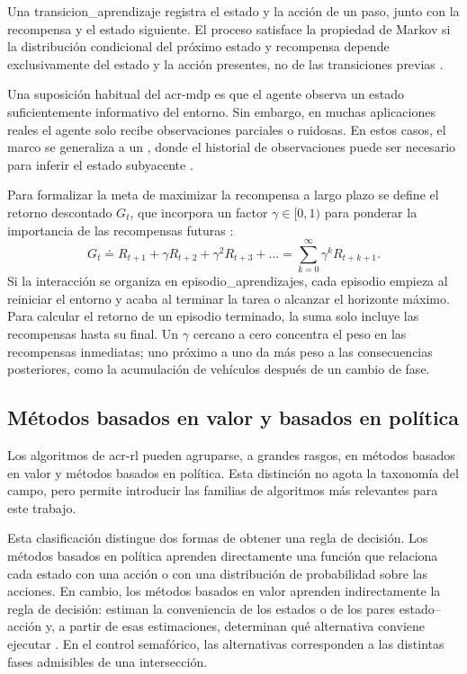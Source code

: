 Una \gls{transicion_aprendizaje} registra el estado y la acción de un paso, junto con la recompensa y el estado siguiente. El proceso satisface la propiedad de Markov si la distribución condicional del próximo estado y recompensa depende exclusivamente del estado y la acción presentes, no de las transiciones previas \cite{suttonRL}.

Una suposición habitual del \gls{acr-mdp} es que el agente observa un estado suficientemente informativo del entorno. Sin embargo, en muchas aplicaciones reales el agente solo recibe observaciones parciales o ruidosas. En estos casos, el marco se generaliza a un , donde el historial de observaciones puede ser necesario para inferir el estado subyacente \cite{marlbook}.

Para formalizar la meta de maximizar la recompensa a largo plazo se define el retorno descontado $G_t$, que incorpora un factor $\gamma \in [0,1)$ para ponderar la importancia de las recompensas futuras \cite{suttonRL}:
\begin{equation}
G_t \doteq R_{t+1} + \gamma R_{t+2} + \gamma^2 R_{t+3} + \dots = \sum_{k=0}^{\infty} \gamma^k R_{t+k+1}.
    \label{eq:retorno_descontado}
\end{equation}
Si la interacción se organiza en \glspl{episodio_aprendizaje}, cada episodio empieza al reiniciar el entorno y acaba al terminar la tarea o alcanzar el horizonte máximo. Para calcular el retorno de un episodio terminado, la suma solo incluye las recompensas hasta su final. Un $\gamma$ cercano a cero concentra el peso en las recompensas inmediatas; uno próximo a uno da más peso a las consecuencias posteriores, como la acumulación de vehículos después de un cambio de fase.

\subsection{Métodos basados en valor y basados en política}

Los algoritmos de \acrshort{acr-rl} pueden agruparse, a grandes rasgos, en métodos basados en valor y métodos basados en política. Esta distinción no agota la taxonomía del campo, pero permite introducir las familias de algoritmos más relevantes para este trabajo.

Esta clasificación distingue dos formas de obtener una regla de decisión. Los métodos basados en política aprenden directamente una función que relaciona cada estado con una acción o con una distribución de probabilidad sobre las acciones. En cambio, los métodos basados en valor aprenden indirectamente la regla de decisión: estiman la conveniencia de los estados o de los pares estado--acción y, a partir de esas estimaciones, determinan qué alternativa conviene ejecutar \cite{suttonRL}. En el control semafórico, las alternativas corresponden a las distintas fases admisibles de una intersección.

